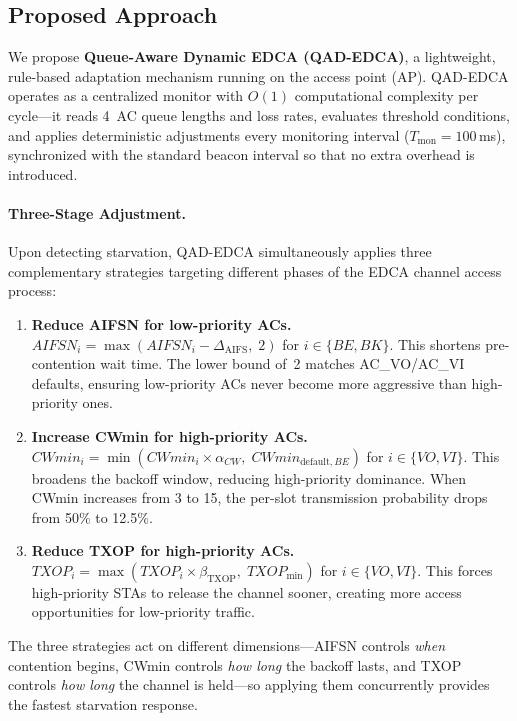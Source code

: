 \documentclass[12pt]{article}
\begin{document}
\subsection{Proposed Approach}

We propose \textbf{Queue-Aware Dynamic EDCA (QAD-EDCA)}, a
lightweight, rule-based adaptation mechanism running on the
access point (AP). QAD-EDCA operates as a centralized monitor
with $O(1)$ computational complexity per cycle---it reads
4~AC queue lengths and loss rates, evaluates threshold
conditions, and applies deterministic adjustments every
monitoring interval ($T_{\text{mon}} = 100$\,ms), synchronized
with the standard beacon interval so that no extra overhead is
introduced.

\paragraph{Three-Stage Adjustment.}
Upon detecting starvation, QAD-EDCA simultaneously applies
three complementary strategies targeting different phases of
the EDCA channel access process:
\begin{enumerate}[noitemsep]
  \item \textbf{Reduce AIFSN for low-priority ACs.}
    $AIFSN_i = \max(AIFSN_i - \Delta_{\text{AIFS}},\; 2)$
    for $i \in \{BE, BK\}$. This shortens pre-contention wait
    time. The lower bound of~2 matches AC\_VO/AC\_VI defaults,
    ensuring low-priority ACs never become more aggressive than
    high-priority ones.
  \item \textbf{Increase CWmin for high-priority ACs.}
    $CWmin_i = \min(CWmin_i \times \alpha_{CW},\;
    CWmin_{\text{default},BE})$ for $i \in \{VO, VI\}$. This
    broadens the backoff window, reducing high-priority
    dominance. When CWmin increases from 3 to 15, the per-slot
    transmission probability drops from 50\% to 12.5\%.
  \item \textbf{Reduce TXOP for high-priority ACs.}
    $TXOP_i = \max(TXOP_i \times \beta_{\text{TXOP}},\;
    TXOP_{\min})$ for $i \in \{VO, VI\}$. This forces
    high-priority STAs to release the channel sooner, creating
    more access opportunities for low-priority traffic.
\end{enumerate}
The three strategies act on different dimensions---AIFSN
controls \emph{when} contention begins, CWmin controls
\emph{how long} the backoff lasts, and TXOP controls
\emph{how long} the channel is held---so applying them
concurrently provides the fastest starvation response.
\end{document}

